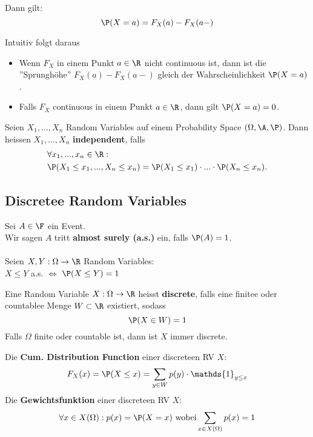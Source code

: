 Dann gilt:
$$\P(X = a) = F_X(a) - F_X(a-)$$

Intuitiv folgt daraus
\begin{itemize}
    \item Wenn $F_X$ in einem Punkt $a \in \R$ nicht continuous ist, dann ist die ''Sprunghöhe'' $F_X(a)-F_X(a-)$ gleich der Wahrscheinlichkeit $\P(X = a)$.
    \item Falls $F_X$ continuous in einem Punkt $a \in \R$, dann gilt $\P(X = a) = 0$. 
\end{itemize}

\begin{mainbox}{}
    Seien $X_1, ...,X_n$ Random Variables auf einem Probability Space $(\Omega, \A, \P)$. Dann heissen $X_1, ...,X_n$ \textbf{independent}, falls
    \begin{align*}
        &\forall x_1, ..., x_n \in \R:\\
        &\P(X_1 \leq x_1, ..., X_n \leq x_n) = \P(X_1 \leq x_1)\cdot ... \cdot \P(X_n \leq x_n).
    \end{align*} 
\end{mainbox}


\subsection{Discretee Random Variables}
Sei $A \in \F$ ein Event.\\
Wir sagen $A$ tritt \textbf{almost surely (a.s.)} ein, falls $\P(A)= 1$.
\\ \\
Seien $X, Y: \Omega \to \R$ Random Variables: \\$X \leq Y$ a.s. $\iff$ $\P(X \leq Y)=1$


\begin{mainbox}{}
    Eine Random Variable $X: \Omega \to \R$ heisst \textbf{discrete}, falls eine finitee oder countablee Menge $W \subset \R$ existiert, sodass
    $$\P(X \in W) = 1$$
    Falls $\Omega$ finite oder countable ist, dann ist $X$ immer discrete.
\end{mainbox}
Die \textbf{Cum. Distribution Function} einer discreteen RV $X$: $$F_X(x)= \P(X \leq x)= \sum_{y\in W}p(y)\cdot \mathds{1}_{y\leq x}$$
Die \textbf{Gewichtsfunktion} einer discreteen RV $X$: $$\forall x \in X(\Omega): p(x)= \P(X=x) \text{ wobei} \sum_{x \in X(\Omega)}p(x)= 1$$

